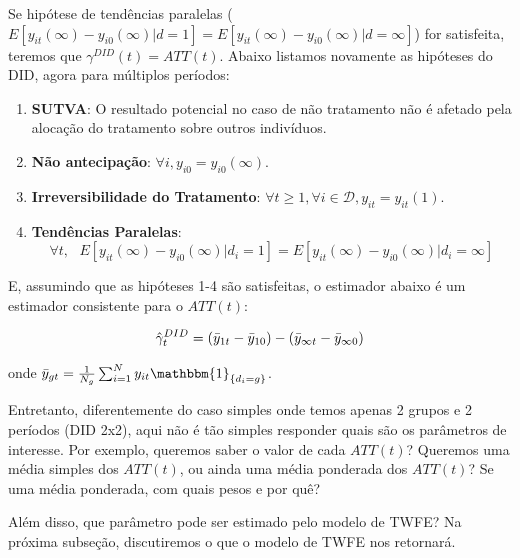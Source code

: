 \documentclass[portugues]{article}
\begin{document}
Se hipótese de tendências paralelas ($E[y_{it}(\infty) - y_{i0}(\infty)|d=1] = E[y_{it}(\infty) - y_{i0}(\infty)|d=\infty]$) for satisfeita, teremos que $\gamma^{DID}(t) = ATT(t)$. Abaixo listamos novamente as hipóteses do DID, agora para múltiplos períodos:

\begin{boxB}
\begin{enumerate}
    \item \textbf{SUTVA}: O resultado potencial no caso de não tratamento não é afetado pela alocação do tratamento sobre outros indivíduos.
    \item \textbf{Não antecipação}: $\forall i,  y_{i0} = y_{i0}(\infty)$.
    \item \textbf{Irreversibilidade do Tratamento}: $\forall t \geq 1, \forall i \in \mathcal{D}, y_{it} = y_{it}(1)$. 
    \item \textbf{Tendências Paralelas}: 
    $$ \forall t, \text{ } E[y_{it}(\infty) - y_{i0}(\infty) | d_i = 1] = E[y_{it}(\infty) - y_{i0}(\infty) | d_i = \infty] $$
\end{enumerate}

\end{boxB}

E, assumindo que as hipóteses 1-4 são satisfeitas, o estimador abaixo é um estimador consistente para o $ATT(t)$:

\begin{equation}\label{eq:1_mean_did_est_mult}
    \hat{\gamma}^{DID}_t = (\Bar{y}_{1t} - \Bar{y}_{10}) - (\Bar{y}_{\infty t} - \Bar{y}_{\infty 0})
\end{equation}

\noindent onde $\Bar{y}_{gt} = \frac{1}{N_g}\sum_{i=1}^{N} y_{it}  \mathbbm{1}_{\{d_i=g\}}$.

Entretanto, diferentemente do caso simples onde temos apenas 2 grupos e 2 períodos (DID 2x2), aqui não é tão simples responder quais são os parâmetros de interesse. Por exemplo, queremos saber o valor de cada $ATT(t)$? Queremos uma média simples dos $ATT(t)$, ou ainda uma média ponderada dos $ATT(t)$? Se uma média ponderada, com quais pesos e por quê?

Além disso, que parâmetro pode ser estimado pelo modelo de TWFE? Na próxima subseção, discutiremos o que o modelo de TWFE nos retornará. 
\end{document}
